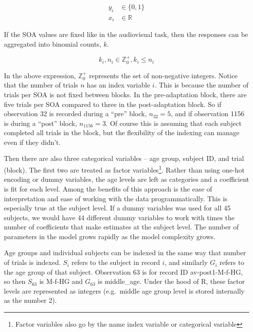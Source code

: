 \documentclass[11pt, oneside, openany]{scrbook}
\begin{document}

\begin{align*}
y_i &\in \lbrace 0, 1\rbrace \\
x_i &\in \mathbb{R}
\end{align*}

If the SOA values are fixed like in the audiovisual task, then the responses can be aggregated into binomial counts, \(k\).


\[
k_i, n_i \in \mathbb{Z}_0^+, k_i \le n_i
\]

In the above expression, \(\mathbb{Z}_0^+\) represents the set of non-negative integers. Notice that the number of trials \(n\) has an index variable \(i\). This is because the number of trials per SOA is not fixed between blocks. In the pre-adaptation block, there are five trials per SOA compared to three in the post-adaptation block. So if observation 32 is recorded during a ``pre'' block, \(n_{32} = 5\), and if observation 1156 is during a ``post'' block, \(n_{1156} = 3\). Of course this is assuming that each subject completed all trials in the block, but the flexibility of the indexing can manage even if they didn't.

Then there are also three categorical variables -- age group, subject ID, and trial (block). The first two are treated as factor variables\footnote{Factor variables also go by the name index variable or categorical variable}. Rather than using one-hot encoding or dummy variables, the age levels are left as categories and a coefficient is fit for each level. Among the benefits of this approach is the ease of interpretation and ease of working with the data programmatically. This is especially true at the subject level. If a dummy variables was used for all 45 subjects, we would have 44 different dummy variables to work with times the number of coefficients that make estimates at the subject level. The number of parameters in the model grows rapidly as the model complexity grows.

Age groups and individual subjects can be indexed in the same way that number of trials is indexed. \(S_i\) refers to the subject in record \(i\), and similarly \(G_i\) refers to the age group of that subject. Observation 63 is for record ID av-post1-M-f-HG, so then \(S_{63}\) is M-f-HG and \(G_{63}\) is middle\_age. Under the hood of R, these factor levels are represented as integers (e.g.~middle age group level is stored internally as the number 2).
\end{document}
